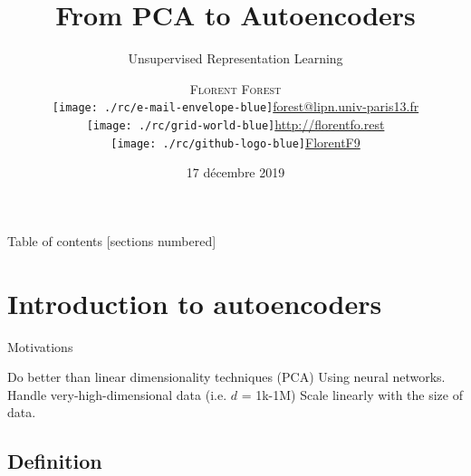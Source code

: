 \documentclass{beamer}
\title{From PCA to Autoencoders}
\subtitle{Unsupervised Representation Learning}
\date{17 décembre 2019}
\author{\textsc{Florent Forest}\vspace{0.2cm}\\
\texttt{[image: ./rc/e-mail-envelope-blue]}\;\scriptsize{\href{mailto:forest@lipn.univ-paris13.fr}{forest@lipn.univ-paris13.fr}}\\
\texttt{[image: ./rc/grid-world-blue]}\;\scriptsize{\href{http://florentfo.rest}{http://florentfo.rest}}\\
\texttt{[image: ./rc/github-logo-blue]}\;\scriptsize{\href{https://github.com/FlorentF9}{FlorentF9}}\\
}
\institute{\vfill\hfill
\texttt{[image: ./rc/logo\_supaero]}}
\begin{document}
  \maketitle

  \begin{frame}{Table of contents}
    [sections numbered]
      \tableofcontents%
  \end{frame}

  \section{Introduction to autoencoders}

  \begin{frame}{Motivations}

    Do better than linear dimensionality techniques (PCA)
    Using neural networks.
    Handle very-high-dimensional data (i.e. $d$ = 1k-1M)
    Scale linearly with the size of data.
    \cite{Hinton2006}
    
  \end{frame}

  \subsection{Definition}
\end{document}
